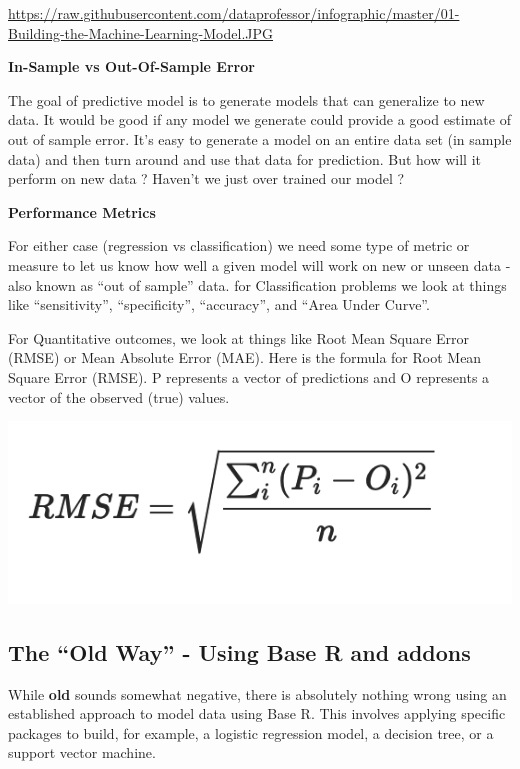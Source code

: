 \documentclass[
]{article}
\begin{document}
\url{https://raw.githubusercontent.com/dataprofessor/infographic/master/01-Building-the-Machine-Learning-Model.JPG}

\textbf{In-Sample vs Out-Of-Sample Error}

The goal of predictive model is to generate models that can generalize
to new data. It would be good if any model we generate could provide a
good estimate of out of sample error. It's easy to generate a model on
an entire data set (in sample data) and then turn around and use that
data for prediction. But how will it perform on new data ? Haven't we
just over trained our model ?

\textbf{Performance Metrics}

For either case (regression vs classification) we need some type of
metric or measure to let us know how well a given model will work on new
or unseen data - also known as ``out of sample'' data. for
Classification problems we look at things like ``sensitivity'',
``specificity'', ``accuracy'', and ``Area Under Curve''.

For Quantitative outcomes, we look at things like Root Mean Square Error
(RMSE) or Mean Absolute Error (MAE). Here is the formula for Root Mean
Square Error (RMSE). P represents a vector of predictions and O
represents a vector of the observed (true) values.

\includegraphics{./IMG/rmse.png}

\hypertarget{the-old-way---using-base-r-and-addons}{%
\subsection{The ``Old Way'' - Using Base R and
addons}\label{the-old-way---using-base-r-and-addons}}

While \textbf{old} sounds somewhat negative, there is absolutely nothing
wrong using an established approach to model data using Base R. This
involves applying specific packages to build, for example, a logistic
regression model, a decision tree, or a support vector machine.
\end{document}
